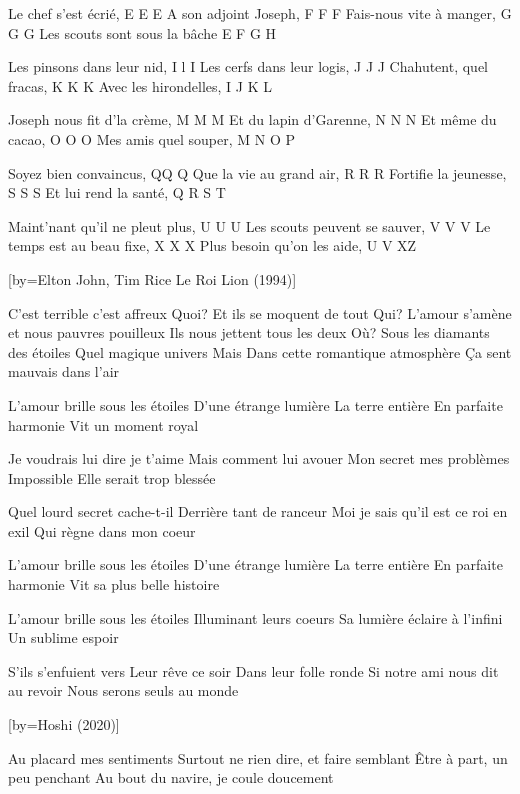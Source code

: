 \beginverse
Le chef s'est écrié, E E E 
A son adjoint Joseph, F F F 
Fais-nous vite à manger, G G G 
Les scouts sont sous la bâche E F G H
\endverse

\beginverse
Les pinsons dans leur nid, I l I 
Les cerfs dans leur logis, J J J 
Chahutent, quel fracas, K K K 
Avec les hirondelles, I J K L
\endverse

\beginverse
Joseph nous fit d'la crème, M M M 
Et du lapin d'Garenne, N N N 
Et même du cacao, O O O
Mes amis quel souper, M N O P
\endverse

\beginverse
Soyez bien convaincus, QQ Q
Que la vie au grand air, R R R
Fortifie la jeunesse, S S S
Et lui rend la santé, Q R S T 
\endverse

\beginverse
Maint'nant qu'il ne pleut plus, U U U 
Les scouts peuvent se sauver, V V V 
Le temps est au beau fixe, X X X
Plus besoin qu'on les aide, U V XZ
\endverse

[by={Elton John, Tim Rice \- Le Roi Lion (1994)}]

\beginverse
C'est terrible c'est affreux
Quoi?
Et ils se moquent de tout
Qui?
L'amour s'amène et nous pauvres pouilleux
Ils nous jettent tous les deux
Où?
Sous les diamants des étoiles
Quel magique univers
Mais
Dans cette romantique atmosphère
Ça sent mauvais dans l'air
\endverse

\beginverse
L'amour brille sous les étoiles
D'une étrange lumière
La terre entière
En parfaite harmonie
Vit un moment royal
\endverse

\beginverse
Je voudrais lui dire je t'aime
Mais comment lui avouer
Mon secret mes problèmes
Impossible
Elle serait trop blessée
\endverse

\beginverse
Quel lourd secret cache-t-il
Derrière tant de ranceur
Moi je sais qu'il est ce roi en exil
Qui règne dans mon coeur
\endverse

\beginverse
L'amour brille sous les étoiles
D'une étrange lumière
La terre entière
En parfaite harmonie
Vit sa plus belle histoire
\endverse

\beginverse
L'amour brille sous les étoiles
Illuminant leurs coeurs
Sa lumière éclaire à l'infini
Un sublime espoir
\endverse

\beginverse
S'ils s'enfuient vers
Leur rêve ce soir
Dans leur folle ronde
Si notre ami nous dit au revoir
Nous serons seuls au monde
\endverse

[by={Hoshi (2020)}]

\beginverse
Au placard mes sentiments
Surtout ne rien dire, et faire semblant
Être à part, un peu penchant
Au bout du navire, je coule doucement
\endverse

